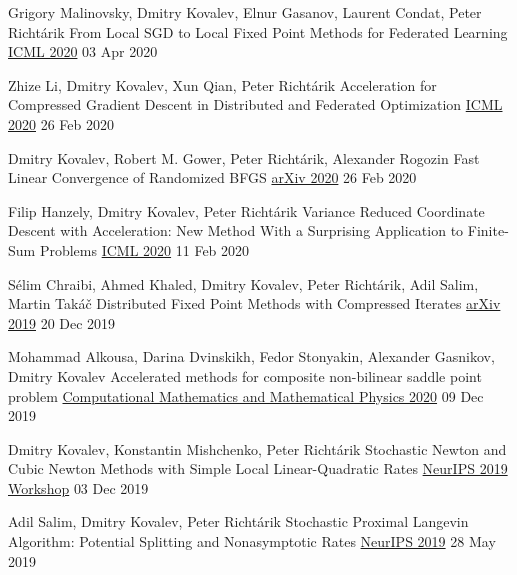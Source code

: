 \begin{cventries}
\cventry
{Grigory Malinovsky, Dmitry Kovalev, Elnur Gasanov, Laurent Condat, Peter Richtárik} %
{From Local SGD to Local Fixed Point Methods for Federated Learning} %
{\href{https://proceedings.icml.cc/paper/2020/hash/53fdae58e861476b182b0cd6beade809-Abstract.html}{ICML 2020}} 
{03 Apr 2020} %
{}	

\cventry
{Zhize Li, Dmitry Kovalev, Xun Qian, Peter Richtárik} %
{Acceleration for Compressed Gradient Descent in Distributed and Federated Optimization} %
{\href{https://proceedings.icml.cc/paper/2020/hash/18ad9899f3f21a5a1583584d5f11c0c0-Abstract.html}{ICML 2020}} 
{26 Feb 2020} %
{}	

\cventry
{Dmitry Kovalev, Robert M. Gower, Peter Richtárik, Alexander Rogozin} %
{Fast Linear Convergence of Randomized BFGS} %
{\href{https://arxiv.org/abs/2002.11337}{arXiv 2020}} 
{26 Feb 2020} %
{}	

\cventry
{Filip Hanzely, Dmitry Kovalev, Peter Richtárik} %
{Variance Reduced Coordinate Descent with Acceleration: New Method With a Surprising Application to Finite-Sum Problems} %
{\href{https://proceedings.icml.cc/paper/2020/hash/b571ecea16a9824023ee1af16897a582-Abstract.html}{ICML 2020}} 
{11 Feb 2020} %
{}	

\cventry
{Sélim Chraibi, Ahmed Khaled, Dmitry Kovalev, Peter Richtárik, Adil Salim, Martin Takáč} %
{Distributed Fixed Point Methods with Compressed Iterates} %
{\href{https://arxiv.org/abs/1912.09925}{arXiv 2019}} 
{20 Dec 2019} %
{}	

\cventry
{Mohammad Alkousa, Darina Dvinskikh, Fedor Stonyakin, Alexander Gasnikov, Dmitry Kovalev} %
{Accelerated methods for composite non-bilinear saddle point problem} %
{\href{https://link.springer.com/article/10.1134/S0965542520110020}{Computational Mathematics and Mathematical Physics 2020}} 
{09 Dec 2019} %
{}	

\cventry
{Dmitry Kovalev, Konstantin Mishchenko, Peter Richtárik} %
{Stochastic Newton and Cubic Newton Methods with Simple Local Linear-Quadratic Rates} %
{\href{https://sites.google.com/site/optneurips19/}{NeurIPS 2019 Workshop}} 
{03 Dec 2019} %
{}	

\cventry
{Adil Salim, Dmitry Kovalev, Peter Richtárik} %
{Stochastic Proximal Langevin Algorithm: Potential Splitting and Nonasymptotic Rates} %
{\href{https://papers.nips.cc/paper/8891-stochastic-proximal-langevin-algorithm-potential-splitting-and-nonasymptotic-rates}{NeurIPS 2019}} 
{28 May 2019} %
{}	


\end{cventries}
